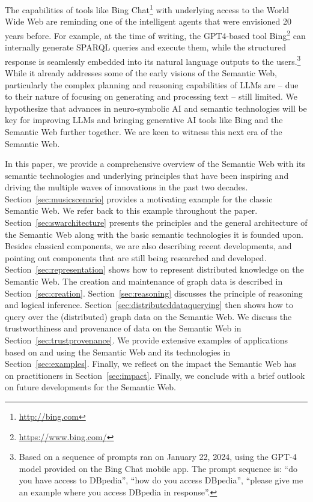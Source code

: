\documentclass[a4paper,USenglish]{tgdk-v2021}
\newcommand{\myurl}[1]{\footnote{\url{#1}}}
\begin{document}
The capabilities of tools like Bing Chat\myurl{http://bing.com} with underlying access to the World Wide Web are reminding one of the intelligent agents that were envisioned 20 years before.
For example, at the time of writing, the GPT4-based tool Bing\footnote{\url{https://www.bing.com/}} can internally generate SPARQL queries and execute them, while the structured response is seamlessly embedded into its natural language outputs to the users.\footnote{Based on a sequence of prompts ran on January 22, 2024, using the GPT-4 model provided on the Bing Chat mobile app.
The prompt sequence is: ``do you have access to DBpedia'', ``how do you access DBpedia'', ``please give me an example where you access DBpedia in response''.}
While it already addresses some of the early visions of the Semantic Web, particularly the complex planning and reasoning capabilities of LLMs are -- due to their nature of focusing on generating and processing text -- still limited.
We hypothesize that advances in neuro-symbolic AI and semantic technologies will be key for improving LLMs and bringing generative AI tools like Bing and the Semantic Web further together.
We are keen to witness this next era of the Semantic Web.

In this paper, we provide a comprehensive overview of the Semantic Web with its semantic technologies and underlying principles that have been inspiring and driving the multiple waves of innovations in the past two decades.
Section~\ref{sec:musicscenario} provides a motivating example for the classic Semantic Web. 
We refer back to this example throughout the paper.
Section~\ref{sec:swarchitecture} presents the principles and the general architecture of the Semantic Web along with the basic semantic technologies it is founded upon. 
Besides classical components, we are also describing recent developments, and pointing out components that are still being researched and developed.
Section~\ref{sec:representation} shows how to represent distributed knowledge on the Semantic Web.
The creation and maintenance of graph data is described in Section~\ref{sec:creation}.
Section~\ref{sec:reasoning} discusses the principle of reasoning and logical inference.
Section~\ref{sec:distributeddataquerying} then shows how to query over the (distributed) graph data on the Semantic Web.
We discuss the trustworthiness and provenance of data on the Semantic Web in Section~\ref{sec:trustprovenance}.
We provide extensive examples of applications based on and using the Semantic Web and its technologies in Section~\ref{sec:examples}.
Finally, we reflect on the impact the Semantic Web has on practitioners in Section~\ref{sec:impact}.
Finally, we conclude with a brief outlook on future developments for the Semantic Web.
\end{document}
